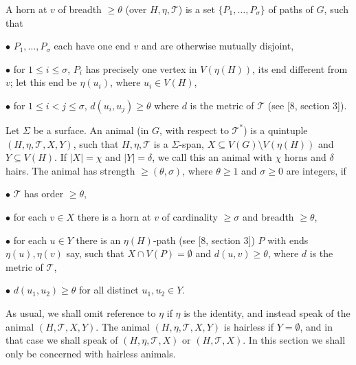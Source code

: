 A horn at $v$ of breadth $\ge \theta$ (over $H, \eta, \mathscr{T}$) is a set $\{P_1, \dots, P_\sigma\}$ of paths of $G$, such that

\hspace*{12pt}$\bullet$ $P_1, \dots, P_\sigma$ each have one end $v$ and are otherwise mutually disjoint,

\hspace*{12pt}$\bullet$ for $1 \le i \le \sigma$, $P_i$ has precisely one vertex in $V(\eta(H))$, its end different from $v$; let this end be $\eta(u_i)$, where $u_i \in V(H)$,

\hspace*{12pt}$\bullet$ for $1 \le i < j \le \sigma$, $d(u_i, u_j) \ge \theta$ where $d$ is the metric of $\mathscr{T}$ (see [8, section 3]).

Let $\Sigma$ be a surface. An animal (in $G$, with respect to $\mathscr{T}^*$) is a quintuple $(H, \eta, \mathscr{T}, X, Y)$, such that $H, \eta, \mathscr{T}$ is a $\Sigma$-span, $X \subseteq V(G) \setminus V(\eta(H))$ and $Y \subseteq V(H)$. If $|X| = \chi$ and $|Y| = \delta$, we call this an animal with $\chi$ horns and $\delta$ hairs. The animal has strength $\ge (\theta, \sigma)$, where $\theta \ge 1$ and $\sigma \ge 0$ are integers, if

\hspace*{12pt}$\bullet$ $\mathscr{T}$ has order $\ge \theta$,

\hspace*{12pt}$\bullet$ for each $v \in X$ there is a horn at $v$ of cardinality $\ge \sigma$ and breadth $\ge \theta$,

\hspace*{12pt}$\bullet$ for each $u \in Y$ there is an $\eta(H)$-path (see [8, section 3]) $P$ with ends $\eta(u), \eta(v)$ say, such that $X \cap V(P) = \emptyset$ and $d(u, v) \ge \theta$, where $d$ is the metric of $\mathscr{T}$,

\hspace*{12pt}$\bullet$ $d(u_1, u_2) \ge \theta$ for all distinct $u_1, u_2 \in Y$.

As usual, we shall omit reference to $\eta$ if $\eta$ is the identity, and instead speak of the animal $(H, \mathscr{T}, X, Y)$. The animal $(H, \eta, \mathscr{T}, X, Y)$ is hairless if $Y = \emptyset$, and in that case we shall speak of $(H, \eta, \mathscr{T}, X)$ or $(H, \mathscr{T}, X)$. In this section we shall only be concerned with hairless animals.

